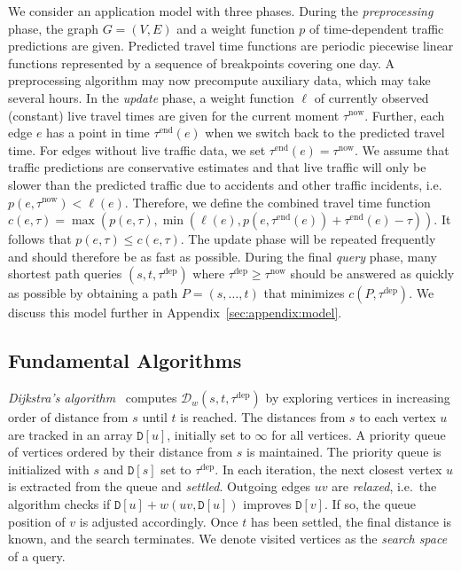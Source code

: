 \documentclass[a4paper,UKenglish,cleveref, autoref, thm-restate,anonymous]{lipics-v2021}
\newcommand*{\pred}{p}
\newcommand*{\comb}{c}
\newcommand*{\dist}{\mathcal{D}}
\newcommand*{\live}{\ell}
\newcommand*{\tdep}{\tau^{\operatorname{dep}}}
\newcommand*{\tend}{\tau^{\operatorname{end}}}
\newcommand*{\tnow}{\tau^{\operatorname{now}}}
\begin{document}
We consider an application model with three phases.
During the \emph{preprocessing} phase, the graph $G=(V,E)$ and a weight function $\pred$ of time-dependent traffic predictions are given.
Predicted travel time functions are periodic piecewise linear functions represented by a sequence of breakpoints covering one day.
A preprocessing algorithm may now precompute auxiliary data, which may take several hours.
In the \emph{update} phase, a weight function $\live$ of currently observed (constant) live travel times are given for the current moment $\tnow$.
Further, each edge $e$ has a point in time $\tend(e)$ when we switch back to the predicted travel time.
For edges without live traffic data, we set $\tend(e) = \tnow$.
We assume that traffic predictions are conservative estimates and that live traffic will only be slower than the predicted traffic due to accidents and other traffic incidents, i.e.\ $\pred(e, \tnow) < \live(e)$.
Therefore, we define the combined travel time function $\comb(e, \tau) = \max(\pred(e, \tau), \min(\live(e), \pred(e, \tend(e)) + \tend(e) - \tau))$.
It follows that $\pred(e, \tau) \leq \comb(e, \tau)$.
The update phase will be repeated frequently and should therefore be as fast as possible.
During the final \emph{query} phase, many shortest path queries $(s,t,\tdep)$ where $\tdep \geq \tnow$ should be answered as quickly as possible by obtaining a path $P = (s,\dots,t)$ that minimizes $\comb(P, \tdep)$.
We discuss this model further in Appendix~\ref{sec:appendix:model}.

\subsection{Fundamental Algorithms}

\emph{Dijkstra's algorithm}~\cite{d-ntpcg-59} computes $\dist_w(s,t,\tdep)$ by exploring vertices in increasing order of distance from $s$ until $t$ is reached.
The distances from $s$ to each vertex $u$ are tracked in an array $\mathtt{D}[u]$, initially set to $\infty$ for all vertices.
A priority queue of vertices ordered by their distance from $s$ is maintained.
The priority queue is initialized with $s$ and $\mathtt{D}[s]$ set to $\tdep$.
In each iteration, the next closest vertex $u$ is extracted from the queue and \emph{settled}.
Outgoing edges $uv$ are \emph{relaxed}, i.e.\ the algorithm checks if $\mathtt{D}[u] + w(uv, \mathtt{D}[u])$ improves $\mathtt{D}[v]$.
If so, the queue position of $v$ is adjusted accordingly.
Once $t$ has been settled, the final distance is known, and the search terminates.
We denote visited vertices as the \emph{search space} of a query.
\end{document}
